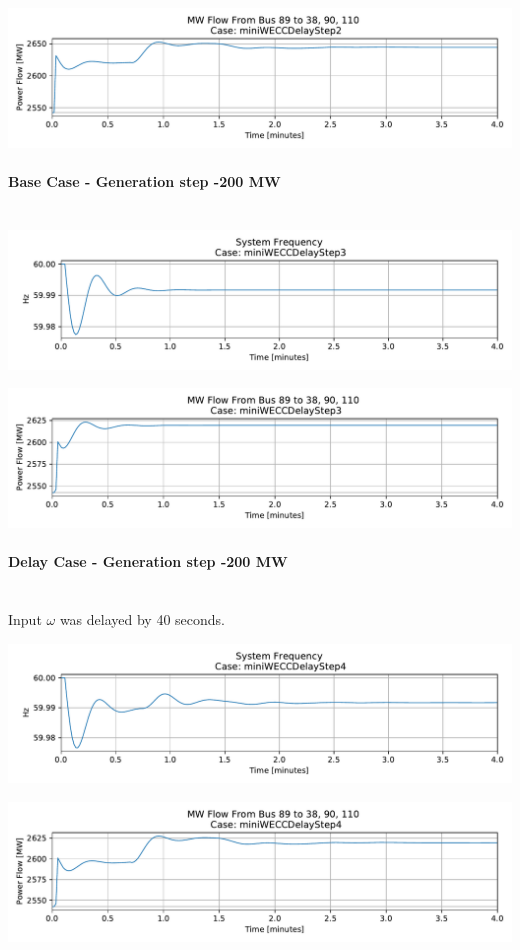 \documentclass[12pt]{article}
\begin{document}
\includegraphics[width=\linewidth]{figures/miniWECCDelayStep2MWflow89to38-90-110}

\pagebreak

\paragraph{Base Case - Generation step -200 MW}\ \\

\includegraphics[width=\linewidth]{figures/miniWECCDelayStep3Freq}

\includegraphics[width=\linewidth]{figures/miniWECCDelayStep3MWflow89to38-90-110}

\paragraph{Delay Case - Generation step -200 MW} \ \\
Input $ \omega$ was delayed by 40 seconds.

\includegraphics[width=\linewidth]{figures/miniWECCDelayStep4Freq}


\includegraphics[width=\linewidth]{figures/miniWECCDelayStep4MWflow89to38-90-110}
\end{document}
